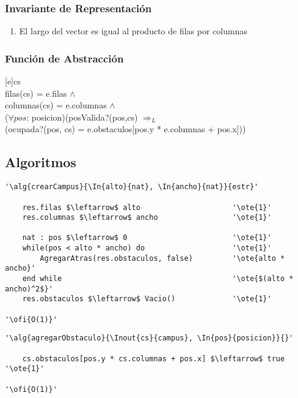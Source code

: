 \subsubsection{Invariante de Representación}

\renewcommand{\labelenumi}{(\Roman{enumi})}

\begin{enumerate}
	\item{El largo del vector es igual al producto de filas por columnas}
\end{enumerate}

\mbox{}

\subsubsection{Funci\'on de Abstracci\'on}

[e]{cs}{
	\\
	filas(cs) = e.filas $\land$ \\
	columnas(cs) = e.columnas $\land$ \\
	($\forall pos$: posicion)(posValida?(pos,cs) $\Rightarrow_L$ 
	\\ \- \- \- \- (ocupada?(pos, cs) = e.obstaculos[pos.y * e.columnas + pos.x]))
}

\subsection{Algoritmos}

\lstset{style=alg}

\begin{lstlisting}[mathescape]
'\alg{crearCampus}{\In{alto}{nat}, \In{ancho}{nat}}{estr}'
	
    res.filas $\leftarrow$ alto 					'\ote{1}'
    res.columnas $\leftarrow$ ancho 				'\ote{1}'

    nat : pos $\leftarrow$ 0 						'\ote{1}'
    while(pos < alto * ancho) do 					'\ote{1}'
    	AgregarAtras(res.obstaculos, false)			'\ote{alto * ancho}'
    end while										'\ote{$(alto * ancho)^2$}'
    res.obstaculos $\leftarrow$ Vacio() 			'\ote{1}'
    
'\ofi{O(1)}'
\end{lstlisting}

\begin{lstlisting}[mathescape]
'\alg{agregarObstaculo}{\Inout{cs}{campus}, \In{pos}{posicion}}{}'

	cs.obstaculos[pos.y * cs.columnas + pos.x] $\leftarrow$ true '\ote{1}'	

'\ofi{O(1)}'
\end{lstlisting}

